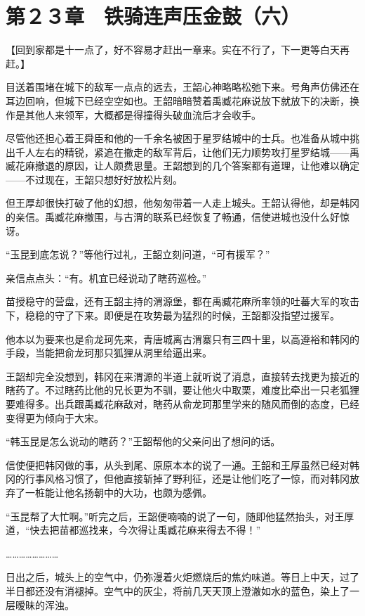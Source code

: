 \section{第２３章　铁骑连声压金鼓（六）}

【回到家都是十一点了，好不容易才赶出一章来。实在不行了，下一更等白天再赶。】

目送着围堵在城下的敌军一点点的远去，王韶心神略略松弛下来。号角声仿佛还在耳边回响，但城下已经空空如也。王韶暗暗赞着禹臧花麻说放下就放下的决断，换作是其他人来领军，大概都是得撞得头破血流后才会收手。

尽管他还担心着王舜臣和他的一千余名被困于星罗结城中的士兵。也准备从城中挑出千人左右的精锐，紧追在撤走的敌军背后，让他们无力顺势攻打星罗结城——禹臧花麻撤退的原因，让人颇费思量。王韶想到的几个答案都有道理，让他难以确定——不过现在，王韶只想好好放松片刻。

但王厚却很快打破了他的幻想，他匆匆带着一人走上城头。王韶认得他，却是韩冈的亲信。禹臧花麻撤围，与古渭的联系已经恢复了畅通，信使进城也没什么好惊讶。

“玉昆到底怎说？”等他行过礼，王韶立刻问道，“可有援军？”

亲信点点头：“有。机宜已经说动了瞎药巡检。”

苗授稳守的营盘，还有王韶主持的渭源堡，都在禹臧花麻所率领的吐蕃大军的攻击下，稳稳的守了下来。即便是在攻势最为猛烈的时候，王韶都没指望过援军。

他本以为要来也是俞龙珂先来，青唐城离古渭寨只有三四十里，以高遵裕和韩冈的手段，当能把俞龙珂那只狐狸从洞里给逼出来。

王韶却完全没想到，韩冈在来渭源的半道上就听说了消息，直接转去找更为接近的瞎药了。不过瞎药比他的兄长更为不驯，要让他火中取栗，难度比牵出一只老狐狸要难得多。出兵跟禹臧花麻敌对，瞎药从俞龙珂那里学来的随风而倒的态度，已经变得更为倾向于大宋。

“韩玉昆是怎么说动的瞎药？”王韶帮他的父亲问出了想问的话。

信使便把韩冈做的事，从头到尾、原原本本的说了一通。王韶和王厚虽然已经对韩冈的行事风格习惯了，但他直接斩掉了野利征，还是让他们吃了一惊，而对韩冈放弃了一桩能让他名扬朝中的大功，也颇为感佩。

“玉昆帮了大忙啊。”听完之后，王韶便喃喃的说了一句，随即他猛然抬头，对王厚道，“快去把苗都巡找来，今次得让禹臧花麻来得去不得！”

……………………

日出之后，城头上的空气中，仍弥漫着火炬燃烧后的焦灼味道。等日上中天，过了半日都还没有消褪掉。空气中的灰尘，将前几天天顶上澄澈如水的蓝色，染上了一层暧昧的浑浊。

